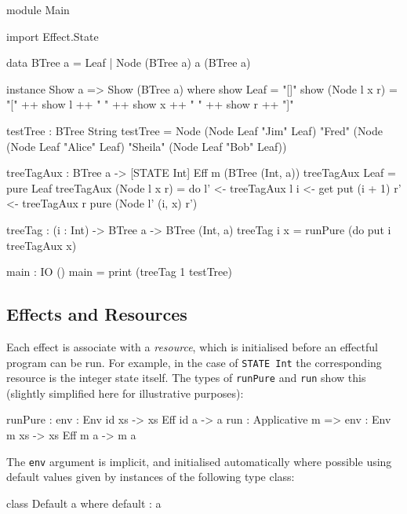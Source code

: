 \begin{code}[float=h,frame=single,caption={Tree tagging}, label=introprog]
module Main

import Effect.State

data BTree a = Leaf
             | Node (BTree a) a (BTree a)

instance Show a => Show (BTree a) where
    show Leaf = "[]"
    show (Node l x r) = "[" ++ show l ++ " "
                            ++ show x ++ " "
                            ++ show r ++ "]"

testTree : BTree String
testTree = Node (Node Leaf "Jim" Leaf)
              "Fred"
              (Node (Node Leaf "Alice" Leaf)
                    "Sheila"
                    (Node Leaf "Bob" Leaf))

treeTagAux : BTree a -> { [STATE Int] } Eff m (BTree (Int, a))
treeTagAux Leaf = pure Leaf
treeTagAux (Node l x r)
  = do l' <- treeTagAux l
       i <- get
       put (i + 1)
       r' <- treeTagAux r
       pure (Node l' (i, x) r')

treeTag : (i : Int) -> BTree a -> BTree (Int, a)
treeTag i x = runPure (do put i
                          treeTagAux x)

main : IO () 
main = print (treeTag 1 testTree) 
\end{code}


\subsection{Effects and Resources}

Each effect is associate with a \emph{resource}, which is initialised before an effectful program can be run.
For example, in the case of \texttt{STATE Int} the corresponding resource is the integer state itself.
The types of \texttt{runPure} and \texttt{run} show this (slightly simplified here for illustrative purposes):

\begin{code}
runPure : {env : Env id xs} -> { xs } Eff id a -> a
run : Applicative m => {env : Env m xs} -> { xs } Eff m a -> m a
\end{code}

\noindent
The \texttt{env} argument is implicit, and initialised automatically where possible using default values given by instances of the following type class:

\begin{code}
class Default a where
    default : a
\end{code}

